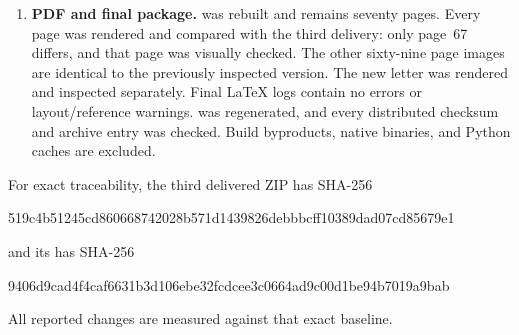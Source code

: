 \documentclass[11pt,a4paper]{article}
\begin{document}
\begin{enumerate}
pair, and the patch itself. The four preceding report pairs and all
three preceding patches are preserved unchanged.
\item \textbf{PDF and final package.}
 was rebuilt and remains seventy pages. Every page
was rendered and compared with the third delivery: only page~67
differs, and that page was visually checked. The other sixty-nine
page images are identical to the previously inspected version.
The new letter was rendered and inspected separately. Final LaTeX
logs contain no errors or layout/reference warnings.
 was regenerated, and every distributed checksum
and archive entry was checked. Build byproducts, native binaries,
and Python caches are excluded.
\end{enumerate}

For exact traceability, the third delivered ZIP has SHA-256
\begin{center}\scriptsize\ttfamily
519c4b51245cd860668742028b571d1439826debbbcff10389dad07cd85679e1
\end{center}
and its  has SHA-256
\begin{center}\scriptsize\ttfamily
9406d9cad4f4caf6631b3d106ebe32fcdcee3c0664ad9c00d1be94b7019a9bab
\end{center}
All reported changes are measured against that exact baseline.
\end{document}
